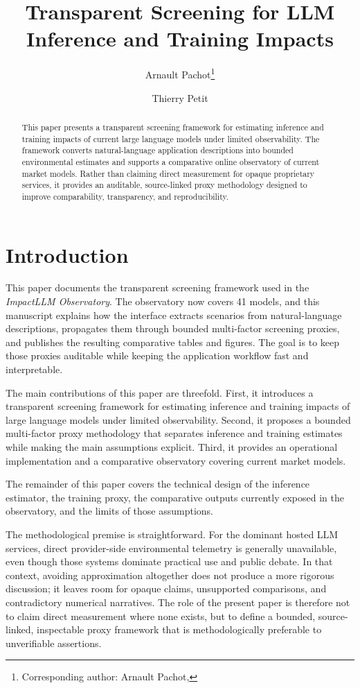 \documentclass[runningheads]{llncs}
\title{Transparent Screening for LLM Inference and Training Impacts}
\author{Arnault Pachot\inst{1}\thanks{Corresponding author: Arnault Pachot, \email{apachot@emotia.com}} \and Thierry Petit\inst{1}}
\institute{Emotia, Paris, France\\
\email{\{apachot,tpetit\}@emotia.com}}
\begin{document}
\maketitle

\begin{abstract}
This paper presents a transparent screening framework for estimating inference and training impacts of current large language models under limited observability. The framework converts natural-language application descriptions into bounded environmental estimates and supports a comparative online observatory of current market models. Rather than claiming direct measurement for opaque proprietary services, it provides an auditable, source-linked proxy methodology designed to improve comparability, transparency, and reproducibility.

\end{abstract}

\section{Introduction}
This paper documents the transparent screening framework used in the \emph{ImpactLLM Observatory}. The observatory now covers 41 models, and this manuscript explains how the interface extracts scenarios from natural-language descriptions, propagates them through bounded multi-factor screening proxies, and publishes the resulting comparative tables and figures. The goal is to keep those proxies auditable while keeping the application workflow fast and interpretable.

The main contributions of this paper are threefold. First, it introduces a transparent screening framework for estimating inference and training impacts of large language models under limited observability. Second, it proposes a bounded multi-factor proxy methodology that separates inference and training estimates while making the main assumptions explicit. Third, it provides an operational implementation and a comparative observatory covering current market models.

The remainder of this paper covers the technical design of the inference estimator, the training proxy, the comparative outputs currently exposed in the observatory, and the limits of those assumptions.

The methodological premise is straightforward. For the dominant hosted LLM services, direct provider-side environmental telemetry is generally unavailable, even though those systems dominate practical use and public debate. In that context, avoiding approximation altogether does not produce a more rigorous discussion; it leaves room for opaque claims, unsupported comparisons, and contradictory numerical narratives. The role of the present paper is therefore not to claim direct measurement where none exists, but to define a bounded, source-linked, inspectable proxy framework that is methodologically preferable to unverifiable assertions.
\end{document}
